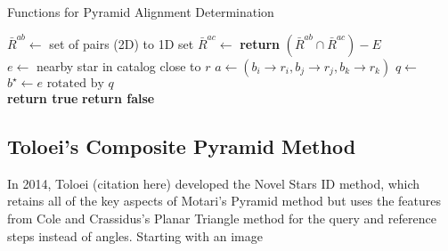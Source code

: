 \begin{algorithm}
\caption{Functions for Pyramid Alignment Determination} \label{Pyramid Helpers}
\begin{algorithmic}[1]
\State $\bar{R}^{ab} \gets $  \Comment set of pairs (2D) to 1D set
\State $\bar{R}^{ac} \gets $ 
\State \textbf{return} $(\bar{R}^{ab} \cap \bar{R}^{ac}) - E$
\EndFunction
\\
\State $e \gets $ nearby star in catalog close to $r$
\State $a \gets (b_i \rightarrow r_i, b_j \rightarrow r_j, b_k \rightarrow r_k)$
\State $q \gets $ 
\State $b^{\star} \gets e \text{ rotated by } q$
\\
\State \textbf{return true}
\Else
\State \textbf{return false}
\EndIf
\EndFunction
\end{algorithmic}
\end{algorithm}

\subsection{Toloei's Composite Pyramid Method}
In 2014, Toloei (citation here) developed the Novel Stars ID method, which retains all of the key aspects of Motari's Pyramid method but uses the features from Cole and Crassidus's Planar Triangle method for the query and reference steps instead of angles. Starting with an image 

